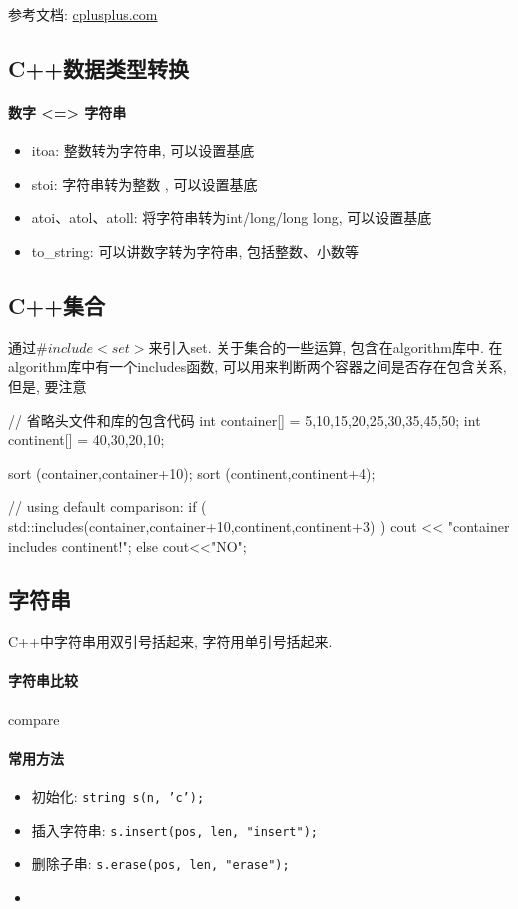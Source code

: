 参考文档: \href{https://www.cplusplus.com/}{cplusplus.com}
\subsection{C++数据类型转换}
\paragraph{数字 <=> 字符串}
\begin{itemize}
	\item itoa: 整数转为字符串, 可以设置基底
	\item stoi: 字符串转为整数 , 可以设置基底
	\item atoi、atol、atoll: 将字符串转为int/long/long long, 可以设置基底
	\item to\_string: 可以讲数字转为字符串, 包括整数、小数等
\end{itemize}

\subsection{C++集合} 通过$\#include<set>$来引入set. 关于集合的一些运算, 包含在algorithm库中. 在algorithm库中有一个includes函数, 可以用来判断两个容器之间是否存在包含关系, 但是, 要注意
\begin{cpp}
	// 省略头文件和库的包含代码
	int container[] = {5,10,15,20,25,30,35,45,50};
	int continent[] = {40,30,20,10};
	
	sort (container,container+10);
	sort (continent,continent+4);
	
	// using default comparison:
	if ( std::includes(container,container+10,continent,continent+3) )
		cout << "container includes continent!\n";
	else	cout<<"NO\n";
	
\end{cpp}


\subsection{字符串}
C++中字符串用双引号括起来, 字符用单引号括起来. 
\paragraph{字符串比较}
compare

\paragraph{常用方法}
\begin{itemize}
	\item 初始化: \texttt{string s(n, 'c');}
	\item 插入字符串: \texttt{s.insert(pos, len, "insert");}
	\item 删除子串: \texttt{s.erase(pos, len, "erase");}
	\item 
\end{itemize}

